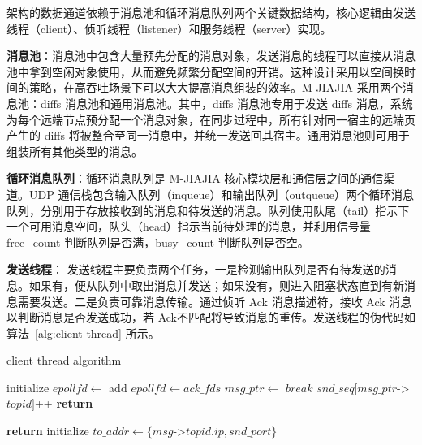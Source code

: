 {\begin{enumerate}[label=\arabic*.]
    架构的数据通道依赖于消息池和循环消息队列两个关键数据结构，核心逻辑由发送线程（client）、侦听线程（listener）和服务线程（server）实现。

    \textbf{消息池}：消息池中包含大量预先分配的消息对象，发送消息的线程可以直接从消息池中拿到空闲对象使用，从而避免频繁分配空间的开销。这种设计采用以空间换时间的策略，在高吞吐场景下可以大大提高消息组装的效率。M-JIAJIA 采用两个消息池：diffs 消息池和通用消息池。其中，diffs 消息池专用于发送 diffs 消息，系统为每个远端节点预分配一个消息对象，在同步过程中，所有针对同一宿主的远端页产生的 diffs 将被整合至同一消息中，并统一发送回其宿主。通用消息池则可用于组装所有其他类型的消息。

    \textbf{循环消息队列}：循环消息队列是 M-JIAJIA 核心模块层和通信层之间的通信渠道。UDP 通信栈包含输入队列（inqueue）和输出队列（outqueue）两个循环消息队列，分别用于存放接收到的消息和待发送的消息。队列使用队尾（tail）指示下一个可用消息空间，队头（head）指示当前待处理的消息，并利用信号量free\_count 判断队列是否满，busy\_count 判断队列是否空。

    \textbf{发送线程}： 发送线程主要负责两个任务，一是检测输出队列是否有待发送的消息。如果有，便从队列中取出消息并发送；如果没有，则进入阻塞状态直到有新消息需要发送。二是负责可靠消息传输。通过侦听 Ack 消息描述符，接收 Ack 消息以判断消息是否发送成功，若 Ack不匹配将导致消息的重传。发送线程的伪代码如算法~\ref{alg:client-thread} 所示。

    \begin{algorithm}[H]
        \caption{client thread algorithm}\label{alg:client-thread}
        \begin{algorithmic}[1] %
                \State initialize $epollfd \gets$ 
                \State add $epollfd \gets ack\_fds$
                    \State {}
                    \State $msg\_ptr \gets$ 
                            \State $break$
                        \EndIf
                    \EndFor
                    \State $snd\_seq[msg\_ptr$->$topid]$++
                    \State {}
                \EndWhile
                \State \textbf{return}
             \EndProcedure
    
                    \State \textbf{return}  
                \Else
                    \State initialize $to\_addr \gets \{msg$->$topid.ip,snd\_port \}$
                    \State {}
                \EndIf
    

\end{algorithmic}
\end{algorithm}
\end{enumerate}}
